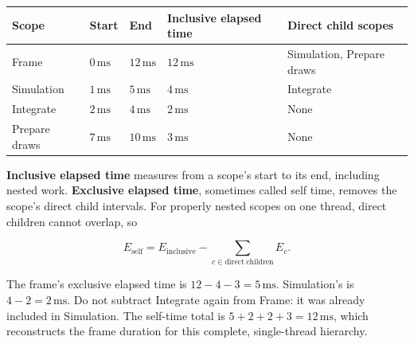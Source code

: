 {\def\LTcaptype{none} %
\begin{longtable}[]{@{}
  >{\raggedright\arraybackslash}p{}
  >{\raggedleft\arraybackslash}p{}
  >{\raggedleft\arraybackslash}p{}
  >{\raggedleft\arraybackslash}p{}
  >{\raggedright\arraybackslash}p{}@{}}
\toprule\noalign{}
\begin{minipage}[b]{\linewidth}\raggedright
Scope
\end{minipage} & \begin{minipage}[b]{\linewidth}\raggedleft
Start
\end{minipage} & \begin{minipage}[b]{\linewidth}\raggedleft
End
\end{minipage} & \begin{minipage}[b]{\linewidth}\raggedleft
Inclusive elapsed time
\end{minipage} & \begin{minipage}[b]{\linewidth}\raggedright
Direct child scopes
\end{minipage} \\
\midrule\noalign{}
\endhead
\bottomrule\noalign{}
\endlastfoot
Frame & \(0\,\mathrm{ms}\) & \(12\,\mathrm{ms}\) & \(12\,\mathrm{ms}\) & Simulation, Prepare draws \\
Simulation & \(1\,\mathrm{ms}\) & \(5\,\mathrm{ms}\) & \(4\,\mathrm{ms}\) & Integrate \\
Integrate & \(2\,\mathrm{ms}\) & \(4\,\mathrm{ms}\) & \(2\,\mathrm{ms}\) & None \\
Prepare draws & \(7\,\mathrm{ms}\) & \(10\,\mathrm{ms}\) & \(3\,\mathrm{ms}\) & None \\
\end{longtable}
}

\textbf{Inclusive elapsed time} measures from a scope's start to its end, including nested work. \textbf{Exclusive elapsed time}, sometimes called self time, removes the scope's direct child intervals. For properly nested scopes on one thread, direct children cannot overlap, so

\[
E_{\mathrm{self}}=E_{\mathrm{inclusive}}
-\sum_{c\in\mathrm{direct\ children}}E_c.
\]

The frame's exclusive elapsed time is \(12-4-3=5\,\mathrm{ms}\). Simulation's is \(4-2=2\,\mathrm{ms}\). Do not subtract Integrate again from Frame: it was already included in Simulation. The self-time total is \(5+2+2+3=12\,\mathrm{ms}\), which reconstructs the frame duration for this complete, single-thread hierarchy.

